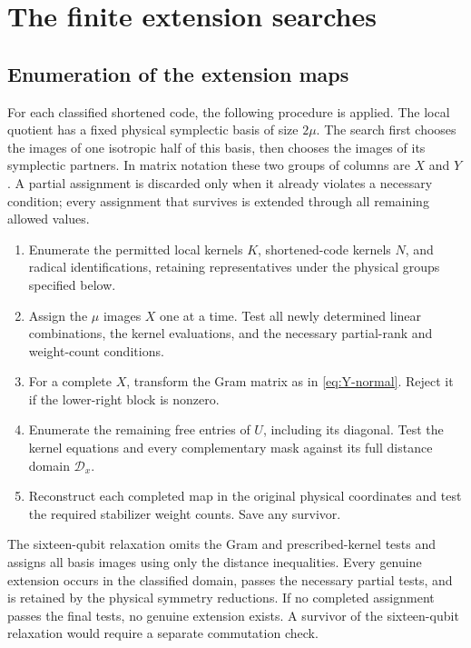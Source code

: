 \section{The finite extension searches}\label{app:search}

\subsection{Enumeration of the extension maps}

For each classified shortened code, the following procedure is applied.
The local quotient has a fixed physical symplectic basis of size \(2\mu\).
The search first chooses the images of one isotropic half of this basis,
then chooses the images of its symplectic partners. In matrix notation
these two groups of columns are \(X\) and \(Y\). A partial assignment
is discarded only when it already violates a necessary condition; every
assignment that survives is extended through all remaining allowed values.
\begin{enumerate}[label=\arabic*.]
\item Enumerate the permitted local kernels \(K\), shortened-code
kernels \(N\), and radical identifications, retaining representatives
under the physical groups specified below.
\item Assign the \(\mu\) images \(X\) one at a time. Test all newly
determined linear combinations, the kernel evaluations, and the
necessary partial-rank and weight-count conditions.
\item For a complete \(X\), transform the Gram matrix as in
\eqref{eq:Y-normal}. Reject it if the lower-right block is nonzero.
\item Enumerate the remaining free entries of \(U\), including its
diagonal. Test the kernel equations and every complementary mask
against its full distance domain \(\mathcal D_x\).
\item Reconstruct each completed map in the original physical coordinates
and test the required stabilizer weight counts. Save any survivor.
\end{enumerate}
The sixteen-qubit relaxation omits the Gram and prescribed-kernel tests
and assigns all basis images using only the distance inequalities.
Every genuine extension occurs in the classified domain, passes the
necessary partial tests, and is retained by the physical symmetry
reductions. If no completed assignment passes the final tests, no
genuine extension exists. A survivor of the sixteen-qubit relaxation
would require a separate commutation check.

